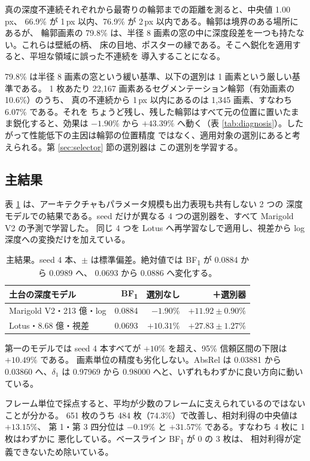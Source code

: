\documentclass[conference]{IEEEtran}
\newcommand{\bfone}{BF\textsubscript{1}}
\begin{document}
真の深度不連続それぞれから最寄りの輪郭までの距離を測ると、中央値 1.00\,px、
66.9\% が 1\,px 以内、76.9\% が 2\,px 以内である。輪郭は境界のある場所にあるが、
輪郭画素の 79.8\% は、半径 8 画素の窓の中に深度段差を一つも持たない。これらは壁紙の柄、
床の目地、ポスターの縁である。そこへ鋭化を適用すると、平坦な領域に誤った不連続を
導入することになる。

79.8\% は半径 8 画素の窓という緩い基準、以下の選別は 1 画素という厳しい基準である。
1 枚あたり 22{,}167 画素あるセグメンテーション輪郭（有効画素の 10.6\%）のうち、
真の不連続から 1\,px 以内にあるのは 1{,}345 画素、すなわち 6.07\% である。それを
ちょうど残し、残した輪郭はすべて元の位置に置いたまま鋭化すると、効果は $-1.90\%$ から
$+43.39\%$ へ動く（表 \ref{tab:diagnosis}）。したがって性能低下の主因は輪郭の位置精度
ではなく、適用対象の選別にあると考えられる。第 \ref{sec:selector} 節の選別器は
この選別を学習する。

\subsection{主結果}
表 \ref{tab:main} は、アーキテクチャもパラメータ規模も出力表現も共有しない 2 つの
深度モデルでの結果である。seed だけが異なる 4 つの選別器を、すべて Marigold V2 の予測で学習した。
同じ 4 つを Lotus へ再学習なしで適用し、視差から log 深度への変換だけを加えている。

\begin{table}[t]
\caption{主結果。seed 4 本、$\pm$ は標準偏差。絶対値では \bfone{} が 0.0884 から 0.0989 へ、
0.0693 から 0.0886 へ変化する。}
\label{tab:main}
\centering
\begin{tabular}{lrrr}
\toprule
土台の深度モデル & \bfone{} & 選別なし & ＋選別器 \\
\midrule
Marigold V2・213 億・log & 0.0884 & $-1.90\%$ & $\mathbf{+11.92 \pm 0.90\%}$ \\
Lotus・8.68 億・視差 & 0.0693 & $+10.31\%$ & $\mathbf{+27.83 \pm 1.27\%}$ \\
\bottomrule
\end{tabular}
\end{table}

第一のモデルでは seed 4 本すべてが $+10\%$ を超え、95\% 信頼区間の下限は $+10.49\%$ である。
画素単位の精度も劣化しない。AbsRel は 0.03881 から 0.03860 へ、$\delta_1$ は 0.97969 から
0.98000 へと、いずれもわずかに良い方向に動いている。

フレーム単位で採点すると、平均が少数のフレームに支えられているのではないことが分かる。
651 枚のうち 484 枚（74.3\%）で改善し、相対利得の中央値は $+13.15\%$、
第 1・第 3 四分位は $-0.19\%$ と $+31.57\%$ である。すなわち 4 枚に 1 枚はわずかに
悪化している。ベースライン \bfone{} が 0 の 3 枚は、
相対利得が定義できないため除いている。
\end{document}
